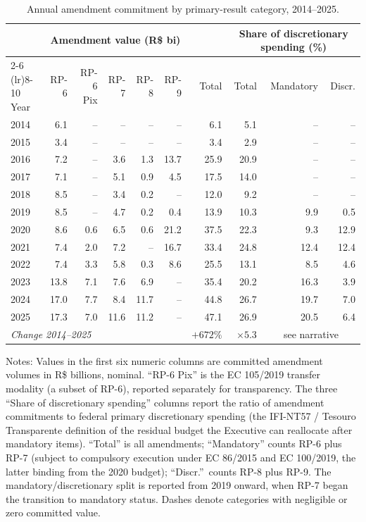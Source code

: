 \documentclass[preprint,12pt,authoryear]{elsarticle}
\begin{document}
\begin{table}[htbp]
\centering
\caption{Annual amendment commitment by primary-result category, 2014--2025.}
\label{tab:stylized}
\begin{threeparttable}
\small
\setlength{\tabcolsep}{4pt}
\begin{tabular}{lrrrrrrrrr}
\toprule
& \multicolumn{5}{c}{Amendment value (R\$ bi)} & & \multicolumn{3}{c}{Share of discretionary spending (\%)} \\
\cmidrule(lr){2-6} \cmidrule(lr){8-10}
Year & RP-6 & RP-6 Pix & RP-7 & RP-8 & RP-9 & Total & Total & Mandatory & Discr.\\
\midrule
2014 & 6.1  & --    & --    & --    & --    & 6.1  & 5.1  & --   & --   \\
2015 & 3.4  & --    & --    & --    & --    & 3.4  & 2.9  & --   & --   \\
2016 & 7.2  & --    & 3.6   & 1.3   & 13.7  & 25.9 & 20.9 & --   & --   \\
2017 & 7.1  & --    & 5.1   & 0.9   & 4.5   & 17.5 & 14.0 & --   & --   \\
2018 & 8.5  & --    & 3.4   & 0.2   & --    & 12.0 & 9.2  & --   & --   \\
2019 & 8.5  & --    & 4.7   & 0.2   & 0.4   & 13.9 & 10.3 & 9.9  & 0.5  \\
2020 & 8.6  & 0.6   & 6.5   & 0.6   & 21.2  & 37.5 & 22.3 & 9.3  & 12.9 \\
2021 & 7.4  & 2.0   & 7.2   & --    & 16.7  & 33.4 & 24.8 & 12.4 & 12.4 \\
2022 & 7.4  & 3.3   & 5.8   & 0.3   & 8.6   & 25.5 & 13.1 & 8.5  & 4.6  \\
2023 & 13.8 & 7.1   & 7.6   & 6.9   & --    & 35.4 & 20.2 & 16.3 & 3.9  \\
2024 & 17.0 & 7.7   & 8.4   & 11.7  & --    & 44.8 & 26.7 & 19.7 & 7.0  \\
2025 & 17.3 & 7.0   & 11.6  & 11.2  & --    & 47.1 & 26.9 & 20.5 & 6.4  \\
\midrule
\multicolumn{6}{l}{\emph{Change 2014--2025}} & $+672\%$ & $\times 5.3$ & \multicolumn{2}{c}{see narrative} \\
\bottomrule
\end{tabular}
\begin{tablenotes}
\small
\item Notes: Values in the first six numeric columns are committed amendment volumes in R\$ billions, nominal. ``RP-6 Pix'' is the EC 105/2019 transfer modality (a subset of RP-6), reported separately for transparency. The three ``Share of discretionary spending'' columns report the ratio of amendment commitments to federal primary discretionary spending (the IFI-NT57 / Tesouro Transparente definition of the residual budget the Executive can reallocate after mandatory items). ``Total'' is all amendments; ``Mandatory'' counts RP-6 plus RP-7 (subject to compulsory execution under EC 86/2015 and EC 100/2019, the latter binding from the 2020 budget); ``Discr.''\ counts RP-8 plus RP-9. The mandatory/discretionary split is reported from 2019 onward, when RP-7 began the transition to mandatory status. Dashes denote categories with negligible or zero committed value.

\end{tablenotes}
\end{threeparttable}
\end{table}
\end{document}

